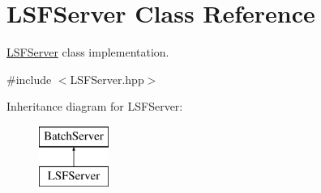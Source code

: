 \hypertarget{classLSFServer}{
\section{LSFServer Class Reference}
\label{classLSFServer}
}


\hyperlink{classLSFServer}{LSFServer} class implementation.  




{\ttfamily \#include $<$LSFServer.hpp$>$}

Inheritance diagram for LSFServer:\begin{figure}[H]
\begin{center}
\leavevmode
\includegraphics[height=2.000000cm]{classLSFServer}
\end{center}
\end{figure}
